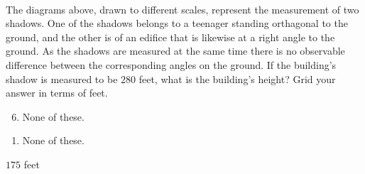   \vspace{-3mm}
\\
The diagrams above, drawn to different scales, represent the measurement of two shadows.  One of the shadows belongs to a teenager standing orthagonal to the ground, and the other is of an edifice that is likewise at a right angle to the ground.  As the shadows are measured at the same time there is no observable difference between the corresponding angles on the ground.  If the building's shadow is measured to be $280$ feet, what is the building's height?  Grid your answer in terms of feet.\\



\ifsat
	\begin{enumerate}[label=\Alph*)]
	\end{enumerate}
\else
\fi

\ifacteven
	\begin{enumerate}[label=\textbf{\Alph*.},itemsep=\fill,align=left]
		\setcounter{enumii}{5}
		\item None of these. 
	\end{enumerate}
\else
\fi

\ifactodd
	\begin{enumerate}[label=\textbf{\Alph*.},itemsep=\fill,align=left]
		\item None of these. 
	\end{enumerate}
\else
\fi

\ifgridin
$175$ feet
\else
\fi

